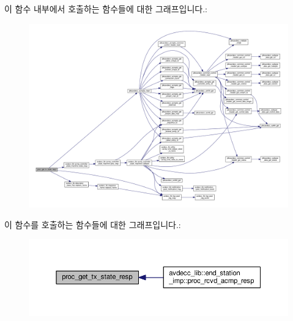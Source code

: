 이 함수 내부에서 호출하는 함수들에 대한 그래프입니다.\+:
\nopagebreak
\begin{figure}[H]
\begin{center}
\leavevmode
\includegraphics[width=350pt]{classavdecc__lib_1_1stream__output__descriptor__imp_ab0fb5eec111670c4c98b6682d56ec8d3_cgraph}
\end{center}
\end{figure}




이 함수를 호출하는 함수들에 대한 그래프입니다.\+:
\nopagebreak
\begin{figure}[H]
\begin{center}
\leavevmode
\includegraphics[width=350pt]{classavdecc__lib_1_1stream__output__descriptor__imp_ab0fb5eec111670c4c98b6682d56ec8d3_icgraph}
\end{center}
\end{figure}


